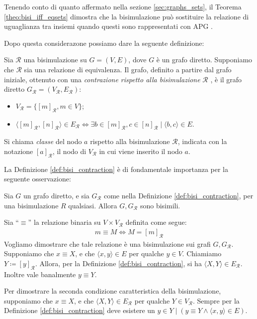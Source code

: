 Tenendo conto di quanto affermato nella sezione \ref{sec:graphs_sets}, il Teorema \ref{theo:bisi_iff_eqsets} dimostra che la bisimulazione può sostituire la relazione di uguaglianza tra insiemi quando questi sono rappresentati con APG \cite{dovier}.

Dopo questa considerazone possiamo dare la seguente definizione:
\begin{definition}
    \label{def:bisi_contraction}
    Sia $\mathcal{R}$ una bisimulazione su $G = (V,E)$, dove $G$ è un grafo diretto. Supponiamo che $\mathcal{R}$ sia una relazione di equivalenza. Il grafo, definito a partire dal grafo iniziale, ottenuto con una \emph{contrazione rispetto alla bisimulazione} $\mathcal{R}$ \cite{gentilini}, è il grafo diretto $G_{\mathcal{R}} = (V_{\mathcal{R}}, E_{\mathcal{R}})$:
    \begin{itemize}
        \item $V_{\mathcal{R}} = \{[m]_{\mathcal{R}}, m \in V\}$;
        \item $\langle [m]_{\mathcal{R}}, [n]_{\mathcal{R}} \rangle \in E_{\mathcal{R}} \iff \exists b \in [m]_{\mathcal{R}}, c \in [n]_{\mathcal{R}} \mid \langle b, c \rangle \in E$.
    \end{itemize}
    Si chiama \emph{classe} del nodo $a$ rispetto alla bisimulazione $\mathcal{R}$, indicata con la notazione $[a]_{\mathcal{R}}$, il nodo di $V_{\mathcal{R}}$ in cui viene inserito il nodo $a$.
\end{definition}

La Definizione \ref{def:bisi_contraction} è di fondamentale importanza per la seguente osservazione:
\begin{proposition}
    Sia $G$ un grafo diretto, e sia $G_{\mathcal{R}}$ come nella Definizione \ref{def:bisi_contraction}, per una bisimulazione $R$ qualsiasi. Allora $G, G_{\mathcal{R}}$ sono bisimili.
    \label{prop:bisi_cont_bisi}
\end{proposition}
\begin{proof2}
    Sia ``$\equiv$'' la relazione binaria su $V\times V_{\mathcal{R}}$ definita come segue:
    \begin{gather*}
        m \equiv M \iff M = [m]_{\mathcal{R}}
    \end{gather*}
    Vogliamo dimostrare che tale relazione è una bisimulazione sui grafi $G, G_{\mathcal{R}}$. Supponiamo che $x \equiv X$, e che $\langle x,y \rangle \in E$ per qualche $y \in V$. Chiamiamo $Y \coloneqq [y]_{\mathcal{R}}$. Allora, per la Definizione \ref{def:bisi_contraction}, si ha $\langle X, Y \rangle \in E_{\mathcal{R}}$. Inoltre vale banalmente $y \equiv Y$.

    Per dimostrare la seconda condizione caratteristica della bisimulazione, supponiamo che $x \equiv X$, e che $\langle X, Y \rangle \in E_{\mathcal{R}}$ per qualche $Y \in V_{\mathcal{R}}$. Sempre per la Definizione \ref{def:bisi_contraction} deve esistere un $y \in Y \mid (y \equiv Y \land \langle x, y \rangle \in E)$.
\end{proof2}

